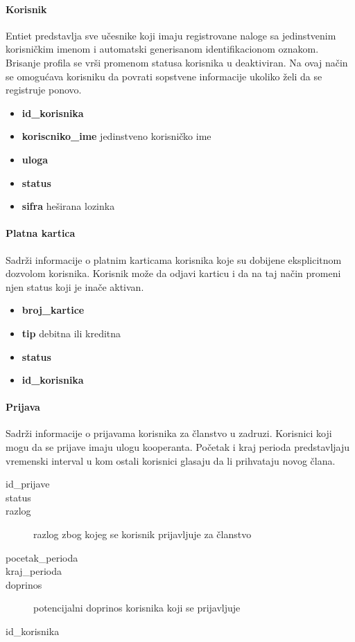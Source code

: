 \documentclass[a4paper, oneside]{article}
\begin{document}
\paragraph{Korisnik} Entiet predstavlja sve učesnike koji imaju registrovane naloge sa jedinstvenim korisničkim imenom i automatski generisanom identifikacionom oznakom. Brisanje profila se vrši promenom statusa korisnika u deaktiviran. Na ovaj način se omogućava korisniku da povrati sopstvene informacije ukoliko želi da se registruje ponovo. 
\begin{itemize}
    \item \textbf{id\_korisnika} 
    \item \textbf{koriscniko\_ime} jedinstveno korisničko ime
    \item \textbf{uloga} 
    \item \textbf{status}
    \item \textbf{sifra} heširana lozinka
\end{itemize}
\paragraph{Platna kartica} Sadrži informacije o platnim karticama korisnika koje su dobijene eksplicitnom dozvolom korisnika. Korisnik može da odjavi karticu i da na taj način promeni njen status koji je inače aktivan. 
\begin{itemize}
    \item \textbf{broj\_kartice} 
    \item \textbf{tip} debitna ili kreditna
    \item \textbf{status} 
    \item \textbf{id\_korisnika}
\end{itemize}
\paragraph{Prijava} Sadrži informacije o prijavama korisnika za članstvo u zadruzi. Korisnici koji mogu da se prijave imaju ulogu kooperanta. Početak i kraj perioda predstavljaju vremenski interval u kom ostali korisnici glasaju da li prihvataju novog člana. 
\begin{description}
    \item[id\_prijave]
    \item[status]
    \item[razlog] razlog zbog kojeg se korisnik prijavljuje za članstvo
    \item[pocetak\_perioda]
    \item[kraj\_perioda]
    \item[doprinos] potencijalni doprinos korisnika koji se prijavljuje
    \item[id\_korisnika]
\end{description}
\end{document}
